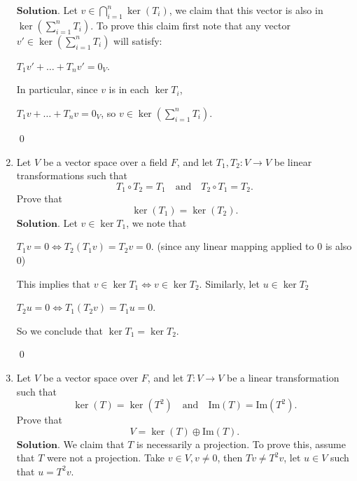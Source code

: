 \documentclass{article}
\theoremstyle{remark}
\begin{document}
\begin{enumerate}
        $\textbf{Solution.}$
        Let $\displaystyle v \in \bigcap_{i=1}^{n} \ker(T_i)$, we claim that this vector is also in $\displaystyle \ker\left(\sum_{i=1}^n T_i\right)$.
        To prove this claim first note that any vector $v' \in \displaystyle \ker\left(\sum_{i=1}^n T_i\right)$ will satisfy:
        \begin{center}
            $T_1v' + \dots + T_nv' = 0_V$.
        \end{center}
        In particular, since $v$ is in each $\ker T_i$,
        \begin{center}
            $T_1v + \dots + T_nv = 0_V$, so $v \in \displaystyle \ker\left(\sum_{i=1}^n T_i\right)$.
        \end{center}
        \begin{flushright}
            \qed
        \end{flushright}
        \item Let \( V \) be a vector space over a field \( F \), and let \( T_1, T_2: V \to V \) be linear transformations such that 
        \[
        T_1 \circ T_2 = T_1 \quad \text{and} \quad T_2 \circ T_1 = T_2.
        \]
        Prove that 
        \[
        \ker(T_1) = \ker(T_2).
        \]
        $\textbf{Solution.}$ Let $v \in \ker T_1$, we note that
        \begin{center}
            $T_1v = 0 \iff T_2(T_1v) = T_2v = 0$. (since any linear mapping applied to 0 is also 0)
        \end{center}
        This implies that $v \in \ker T_1 \iff v \in \ker T_2$. Similarly, let $u \in \ker T_2$
        \begin{center}
            $T_2u = 0 \iff T_1(T_2v) = T_1u = 0$.
        \end{center}
        So we conclude that $\ker T_1 = \ker T_2$.
        \begin{flushright}
            \qed
        \end{flushright}
        \item Let \( V \) be a vector space over \( F \), and let \( T: V \to V \) be a linear transformation such that 
        \[
        \ker(T) = \ker(T^2) \quad \text{and} \quad \text{Im}(T) = \text{Im}(T^2).
        \]
        Prove that 
        \[
        V = \ker(T) \oplus \text{Im}(T).
        \]
        $\textbf{Solution.}$ We claim that $T$ is necessarily a projection. To prove this, assume that $T$ were not a projection.
        Take $v \in V, v \neq 0$, then $Tv \neq T^2v$, let $u \in V$ such that $u = T^2v$.


\end{enumerate}
\end{document}
